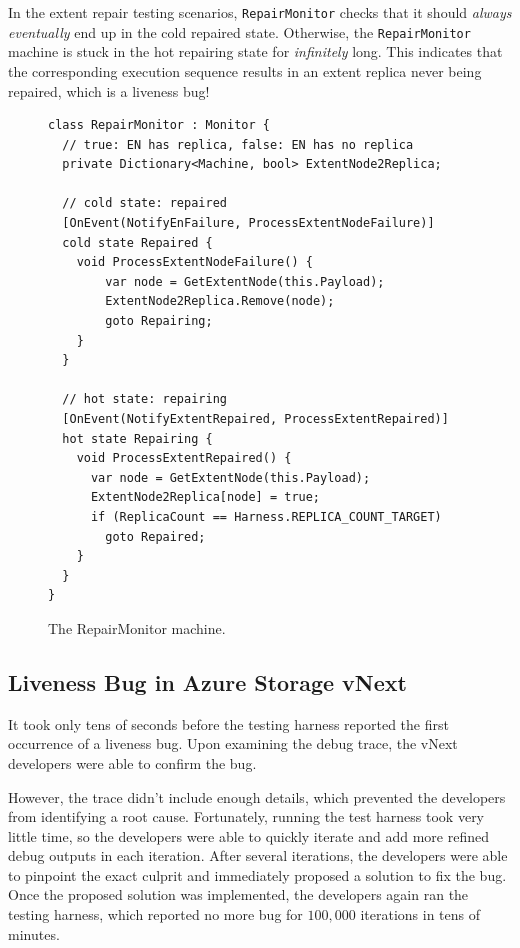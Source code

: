 
In the extent repair testing scenarios, \texttt{RepairMonitor} checks that it should {\em always eventually} end up in the cold repaired state. Otherwise, the \texttt{RepairMonitor} machine is stuck in the hot repairing state for {\em infinitely} long. This indicates that the corresponding execution sequence results in an extent replica never being repaired, which is a liveness bug!

\begin{figure}[t]
\begin{lstlisting}
class RepairMonitor : Monitor {
  // true: EN has replica, false: EN has no replica
  private Dictionary<Machine, bool> ExtentNode2Replica;

  // cold state: repaired
  [OnEvent(NotifyEnFailure, ProcessExtentNodeFailure)]
  cold state Repaired {
    void ProcessExtentNodeFailure() {
        var node = GetExtentNode(this.Payload);
        ExtentNode2Replica.Remove(node);
        goto Repairing;
    }
  }

  // hot state: repairing
  [OnEvent(NotifyExtentRepaired, ProcessExtentRepaired)]
  hot state Repairing {
    void ProcessExtentRepaired() {
      var node = GetExtentNode(this.Payload);
      ExtentNode2Replica[node] = true;
      if (ReplicaCount == Harness.REPLICA_COUNT_TARGET)
        goto Repaired;
    }
  }
}
\end{lstlisting}
\vspace{-2mm}
\caption{The RepairMonitor machine.}
\label{fig:monitor}
\end{figure}

\subsection{Liveness Bug in Azure Storage vNext}
\label{sec:method:azurestore}

It took only tens of seconds before the testing harness reported the first occurrence of a liveness bug. Upon examining the debug trace, the vNext developers were able to confirm the bug.

However, the trace didn't include enough details, which prevented the developers from identifying a root cause. Fortunately, running the test harness took very little time, so the developers were able to quickly iterate and add more refined debug outputs in each iteration. After several iterations, the developers were able to pinpoint the exact culprit and immediately proposed a solution to fix the bug. Once the proposed solution was implemented, the developers again ran the testing harness, which reported no more bug for $100,000$ iterations in tens of minutes.

